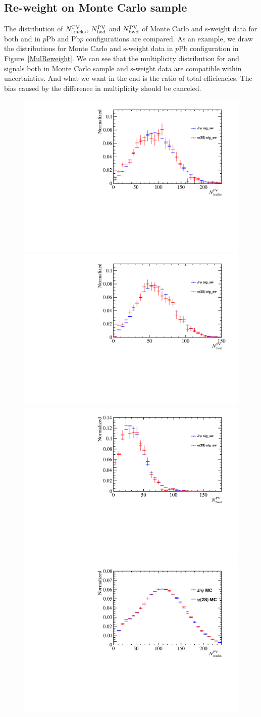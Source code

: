 \subsection{Re-weight on Monte Carlo sample}
The distribution of $N^{\rm PV}_{\rm tracks}$, $N^{\rm PV}_{\rm fwd}$ and $N^{\rm PV}_{\rm bwd}$ of Monte Carlo and s-weight data for both \jpsi and \psitwos in $p$Pb and Pb$p$ configurations are compared. As an example, we draw the distributions for Monte Carlo and s-weight data in $p$Pb configuration in Figure~\ref{MulReweight}. We can see that the multiplicity distribution for \jpsi and \psitwos signals both in Monte Carlo sample and s-weight data are compatible within uncertainties. And what we want in the end is the ratio of total efficiencies. The bias caused by the difference in multiplicity should be canceled.
\begin{figure}[H]
\begin{center}
\includegraphics[width=0.32\linewidth]{pdf/pPb/Workdir/Reweight/sWeightMul.pdf}
\includegraphics[width=0.32\linewidth]{pdf/pPb/FWorkdir/Reweight/sWeightMul.pdf}
\includegraphics[width=0.32\linewidth]{pdf/pPb/BWorkdir/Reweight/sWeightMul.pdf}
\includegraphics[width=0.32\linewidth]{pdf/pPb/Workdir/Reweight/MCMul.pdf}

\end{center}
\end{figure}
